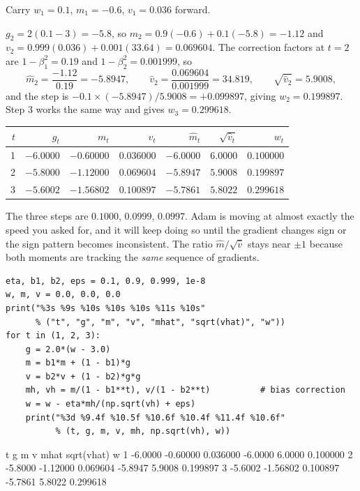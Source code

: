 \documentclass[11pt]{article}
\begin{document}
\begin{worked}
Carry $w_1 = 0.1$, $m_1 = -0.6$, $v_1 = 0.036$ forward.

$g_2 = 2(0.1-3) = -5.8$, so $m_2 = 0.9(-0.6) + 0.1(-5.8) = -1.12$ and
$v_2 = 0.999(0.036) + 0.001(33.64) = 0.069604$. The correction factors at
$t=2$ are $1-\beta_1^2 = 0.19$ and $1-\beta_2^2 = 0.001999$, so
\[
  \hat m_2 = \frac{-1.12}{0.19} = -5.8947,
  \qquad
  \hat v_2 = \frac{0.069604}{0.001999} = 34.819,
  \qquad \sqrt{\hat v_2} = 5.9008 ,
\]
and the step is $-0.1 \times (-5.8947)/5.9008 = +0.099897$, giving
$w_2 = 0.199897$. Step 3 works the same way and gives $w_3 = 0.299618$.

\begin{center}
\begin{tabular}{@{}rrrrrrr@{}}
\toprule
$t$ & $g_t$ & $m_t$ & $v_t$ & $\hat m_t$ & $\sqrt{\hat v_t}$ & $w_t$\\
\midrule
1 & $-6.0000$ & $-0.60000$ & $0.036000$ & $-6.0000$ & $6.0000$ & $0.100000$\\
2 & $-5.8000$ & $-1.12000$ & $0.069604$ & $-5.8947$ & $5.9008$ & $0.199897$\\
3 & $-5.6002$ & $-1.56802$ & $0.100897$ & $-5.7861$ & $5.8022$ & $0.299618$\\
\bottomrule
\end{tabular}
\end{center}

The three steps are $0.1000$, $0.0999$, $0.0997$. Adam is moving at almost
exactly the speed you asked for, and it will keep doing so until the gradient
changes sign or the sign pattern becomes inconsistent. The ratio
$\hat m/\sqrt{\hat v}$ stays near $\pm 1$ because both moments are tracking the
\emph{same} sequence of gradients.
\end{worked}

\begin{lstlisting}
eta, b1, b2, eps = 0.1, 0.9, 0.999, 1e-8
w, m, v = 0.0, 0.0, 0.0
print("%3s %9s %10s %10s %10s %11s %10s"
      % ("t", "g", "m", "v", "mhat", "sqrt(vhat)", "w"))
for t in (1, 2, 3):
    g = 2.0*(w - 3.0)
    m = b1*m + (1 - b1)*g
    v = b2*v + (1 - b2)*g*g
    mh, vh = m/(1 - b1**t), v/(1 - b2**t)          # bias correction
    w = w - eta*mh/(np.sqrt(vh) + eps)
    print("%3d %9.4f %10.5f %10.6f %10.4f %11.4f %10.6f"
          % (t, g, m, v, mh, np.sqrt(vh), w))
\end{lstlisting}
\begin{codeout}
  t         g          m          v       mhat  sqrt(vhat)          w
  1   -6.0000   -0.60000   0.036000    -6.0000      6.0000   0.100000
  2   -5.8000   -1.12000   0.069604    -5.8947      5.9008   0.199897
  3   -5.6002   -1.56802   0.100897    -5.7861      5.8022   0.299618
\end{codeout}
\end{document}
